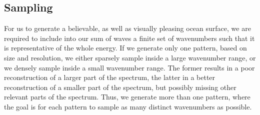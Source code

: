 \subsection{Sampling}
%
For us to generate a believable, as well as visually pleasing ocean surface, we
are required to include into our sum of waves a finite set of wavenumbers such
that it is representative of the whole energy. If we generate only one pattern,
based on size and resolution, we either sparsely sample inside a large
wavenumber range, or we densely sample inside a small wavenumber range. The
former results in a poor reconstruction of a larger part of the spectrum, the
latter in a better reconstruction of a smaller part of the spectrum, but
possibly missing other relevant parts of the spectrum. Thus, we generate more
than one pattern, where the goal is for each pattern to sample as many distinct
wavenumbers as possible.
%
